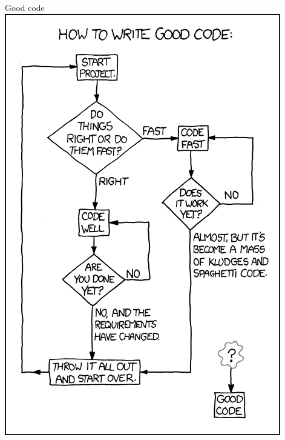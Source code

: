 \documentclass[11pt,professionalfonts]{beamer}
\begin{document}
\begin{frame}{Good code}
    \centering
    \includegraphics[height=0.9\textheight]{figures/good_code_xkcd.png}
\end{frame}
\end{document}
